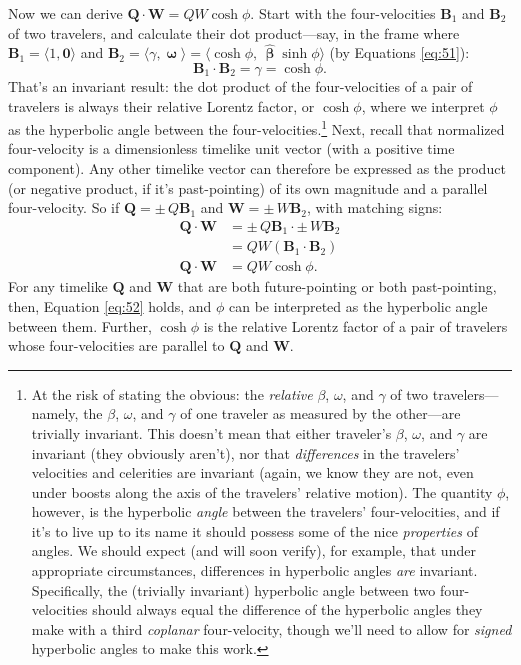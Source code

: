 \documentclass[12pt]{article}
\renewcommand{\vv}[1]{\mathbf{#1}}
\newcommand{\hatbeta}{\bm{\hat{\upbeta}}}
\newcommand{\vvomega}{\bm{\upomega}}
\begin{document}
Now we can derive $\vv Q \cdot \vv W = QW \cosh \phi$. Start with the four-velocities $\vv B_1$ and $\vv B_2$ of two travelers, and calculate their dot product---say, in the frame where $\vv B_1 = \langle 1, \vv 0 \rangle$ and $\vv B_2 = \langle \gamma, \vvomega \rangle = \langle \cosh{\phi}, \, \hatbeta \sinh{\phi} \rangle$ (by Equations \ref{eq:51}):
\begin{equation*}
\vv B_1 \cdot \vv B_2 = \gamma = \cosh{\phi}.
\end{equation*}
That's an invariant result: the dot product of the four-velocities of a pair of travelers is always their relative Lorentz factor, or $\cosh{\phi}$, where we interpret $\phi$ as the hyperbolic angle between the four-velocities.\footnote{\label{fn:ha}At the risk of stating the obvious: the \emph{relative} $\beta$, $\omega$, and $\gamma$ of two travelers---namely, the $\beta$, $\omega$, and $\gamma$ of one traveler as measured by the other---are trivially invariant. This doesn't mean that either traveler's $\beta$, $\omega$, and $\gamma$ are invariant (they obviously aren't), nor that \emph{differences} in the travelers' velocities and celerities are invariant (again, we know they are not, even under boosts along the axis of the travelers' relative motion). The quantity $\phi$, however, is the hyperbolic \emph{angle} between the travelers' four-velocities, and if it's to live up to its name it should possess some of the nice \emph{properties} of angles. We should expect (and will soon verify), for example, that under appropriate circumstances, differences in hyperbolic angles \emph{are} invariant. Specifically, the (trivially invariant) hyperbolic angle between two four-velocities should always equal the difference of the hyperbolic angles they make with a third \emph{coplanar} four-velocity, though we'll need to allow for \emph{signed} hyperbolic angles to make this work.} Next, recall that normalized four-velocity is a dimensionless timelike unit vector (with a positive time component). Any other timelike vector can therefore be expressed as the product (or negative product, if it's past-pointing) of its own magnitude and a parallel four-velocity. So if $\vv Q = \pm \, Q \vv B_1$ and $\vv W = \pm \, W \vv B_2$, with matching signs:
\begin{equation}\label{eq:52}
\begin{split}
\vv Q \cdot \vv W &= \pm \, Q \vv B_1 \cdot \pm \, W \vv B_2 \\
&= QW (\vv B_1 \cdot \vv B_2) \\
\vv Q \cdot \vv W &= QW \cosh{\phi}.
\end{split}
\end{equation}
For any timelike $\vv Q$ and $\vv W$ that are both future-pointing or both past-pointing, then, Equation \ref{eq:52} holds, and $\phi$ can be interpreted as the hyperbolic angle between them. Further, $\cosh{\phi}$ is the relative Lorentz factor of a pair of travelers whose four-velocities are parallel to $\vv Q$ and $\vv W$.
\end{document}

